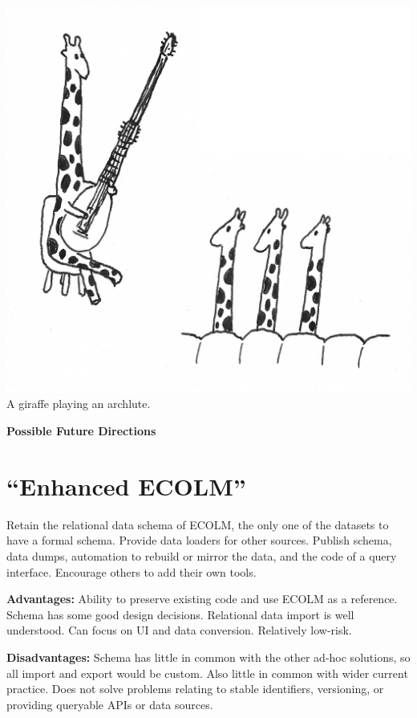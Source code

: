\documentclass[a0,landscape]{a0poster}
\begin{document}
\begin{multicols}{3}
\begin{sloppypar}
  \begin{center}\vspace{1cm}
    \includegraphics[width=0.7\columnwidth]{images/giraffe-archlute-2}\\
    \vspace{-1cm}
  {\small A giraffe playing an archlute.}
    \vspace{1cm}
  \end{center}

  \vspace{1cm}
  \noindent\textbf{\LARGE Possible Future Directions}\\
  \vspace{-2cm}
  \section{``Enhanced ECOLM''}

  Retain the relational data schema of ECOLM, the only one of the
  datasets to have a formal schema. Provide data loaders for other
  sources. Publish schema, data dumps, automation to rebuild or mirror
  the data, and the code of a query interface. Encourage others to
  add their own tools.

  \noindent\textbf{Advantages:} Ability to preserve existing code and
  use ECOLM as a reference. Schema has some good design
  decisions. Relational data import is well understood. Can focus on
  UI and data conversion. Relatively low-risk.

  \noindent\textbf{Disadvantages:} Schema has little in common with
  the other ad-hoc solutions, so all import and export would be
  custom. Also little in common with wider current practice. Does not
  solve problems relating to stable identifiers, versioning, or
  providing queryable APIs or data sources.


\end{sloppypar}
\end{multicols}
\end{document}

